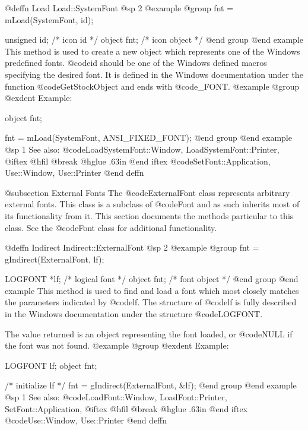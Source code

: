 @deffn {Load} Load::SystemFont
@sp 2
@example
@group
fnt = mLoad(SystemFont, id);

unsigned id;    /*  icon id      */
object   fnt;   /*  icon object  */
@end group
@end example
This method is used to create a new object which represents one of the
Windows predefined fonts.  @code{id} should be one of the Windows
defined macros specifying the desired font.  It is defined in the
Windows documentation under the function @code{GetStockObject} and
ends with @code{_FONT}.
@example
@group
@exdent Example:

object  fnt;

fnt = mLoad(SystemFont, ANSI_FIXED_FONT);
@end group
@end example
@sp 1
See also:  @code{LoadSystemFont::Window, LoadSystemFont::Printer,}
@iftex
@hfil @break @hglue .63in 
@end iftex
@code{SetFont::Application, Use::Window, Use::Printer}
@end deffn











@subsection External Fonts
The @code{ExternalFont} class represents arbitrary external fonts.  This
class is a subclass of @code{Font} and as such inherits most of its
functionality from it.  This section documents the methods particular to
this class.  See the @code{Font} class for additional functionality.









@deffn {Indirect} Indirect::ExternalFont
@sp 2
@example
@group
fnt = gIndirect(ExternalFont, lf);

LOGFONT *lf;    /*  logical font  */
object  fnt;    /*  font object   */
@end group
@end example
This method is used to find and load a font which most closely matches
the parameters indicated by @code{lf}.  The structure of @code{lf} is
fully described in the Windows documentation under the structure
@code{LOGFONT}.

The value returned is an object representing the font loaded, or
@code{NULL} if the font was not found.
@example
@group
@exdent Example:

LOGFONT lf;
object  fnt;

/*  initialize lf  */
fnt = gIndirect(ExternalFont, &lf);
@end group
@end example
@sp 1
See also:  @code{LoadFont::Window, LoadFont::Printer, SetFont::Application,}
@iftex
@hfil @break @hglue .63in 
@end iftex
@code{Use::Window, Use::Printer}
@end deffn











